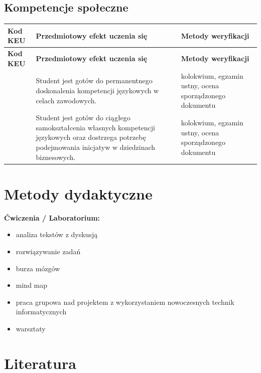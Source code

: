 \documentclass[12pt, a4paper]{article}
\newcommand{\thdrule}{\noalign{\global\setlength{\extrarowheight}{0pt}}}
\newcommand{\thdend}{\noalign{\global\setlength{\extrarowheight}{3pt}}}
\begin{document}
\subsection*{Kompetencje społeczne}
{\scriptsize
\begin{longtable}{m{1.6cm}m{9.0cm}m{4.2cm}}
\thdrule\toprule
\rowcolor{pjatkRed} {\color{white}\footnotesize\textbf{\vphantom{Ag}Kod KEU}} & {\color{white}\footnotesize\textbf{\vphantom{Ag}Przedmiotowy efekt uczenia się}} & {\color{white}\footnotesize\textbf{\vphantom{Ag}Metody weryfikacji}} \\
\midrule\thdend
\endfirsthead
\thdrule\toprule
\rowcolor{pjatkRed} {\color{white}\footnotesize\textbf{\vphantom{Ag}Kod KEU}} & {\color{white}\footnotesize\textbf{\vphantom{Ag}Przedmiotowy efekt uczenia się}} & {\color{white}\footnotesize\textbf{\vphantom{Ag}Metody weryfikacji}} \\
\midrule\thdend
\endhead
  \rowcolor{tableRowLight}  & Student jest gotów do permanentnego doskonalenia kompetencji językowych w celach zawodowych. & kolokwium, egzamin ustny, ocena sporządzonego dokumentu \\
  \rowcolor{tableRowAlt}  & Student jest gotów do ciągłego samokształcenia własnych kompetencji językowych oraz dostrzega potrzebę podejmowania inicjatyw w dziedzinach biznesowych. & kolokwium, egzamin ustny, ocena sporządzonego dokumentu \\
\bottomrule
\end{longtable}}

\section{Metody dydaktyczne}

\textbf{Ćwiczenia / Laboratorium:}
\begin{itemize}
  \item analiza tekstów z dyskusją
  \item rozwiązywanie zadań
  \item burza mózgów
  \item mind map
  \item praca grupowa nad projektem z wykorzystaniem nowoczesnych technik informatycznych
  \item warsztaty
\end{itemize}
\vspace{4pt}


\section{Literatura}
\end{document}
